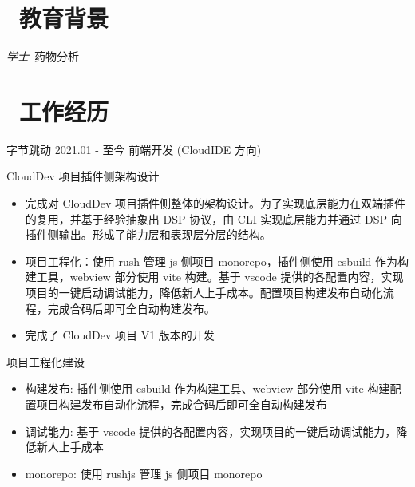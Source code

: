 \documentclass{resume}
\begin{document}



\section{\faGraduationCap\  教育背景}
\textit{学士}\ 药物分析

\section{\faUsers\ 工作经历}
字节跳动 2021.01 - 至今
前端开发 (CloudIDE 方向)


\begin{onehalfspacing}
CloudDev 项目插件侧架构设计
\begin{itemize}
  \item 完成对 CloudDev 项目插件侧整体的架构设计。为了实现底层能力在双端插件的复用，并基于经验抽象出 DSP 协议，由 CLI 实现底层能力并通过 DSP 向插件侧输出。形成了能力层和表现层分层的结构。
  \item 项目工程化：使用 rush 管理 js 侧项目 monorepo，插件侧使用 esbuild 作为构建工具，webview 部分使用 vite 构建。基于 vscode 提供的各配置内容，实现项目的一键启动调试能力，降低新人上手成本。配置项目构建发布自动化流程，完成合码后即可全自动构建发布。
  \item 完成了 CloudDev 项目 V1 版本的开发
\end{itemize}
\end{onehalfspacing}

\begin{onehalfspacing}
项目工程化建设
\begin{itemize}
  \item 构建发布: 插件侧使用 esbuild 作为构建工具、webview 部分使用 vite 构建配置项目构建发布自动化流程，完成合码后即可全自动构建发布
  \item 调试能力: 基于 vscode 提供的各配置内容，实现项目的一键启动调试能力，降低新人上手成本
  \item monorepo: 使用 rushjs 管理 js 侧项目 monorepo
\end{itemize}
\end{onehalfspacing}
\end{document}
